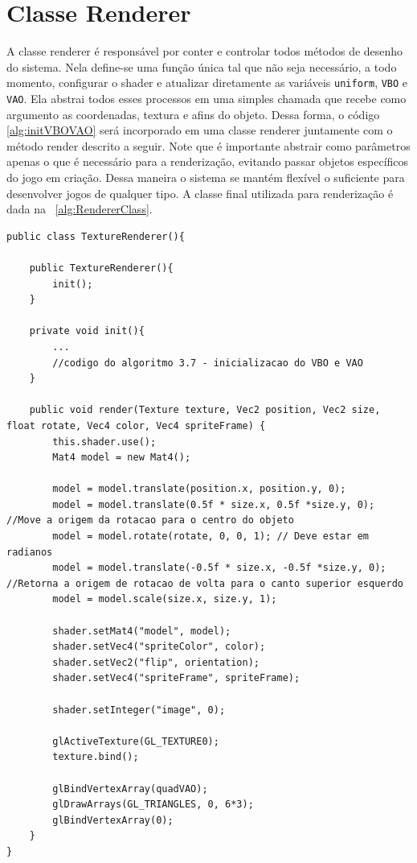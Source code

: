 \documentclass[12pt, 
openright, 
oneside, 
a4paper,    
brazil]{facom-ufu-abntex2}
\begin{document}
\section{Classe Renderer}
A classe renderer é responsável por conter e controlar todos métodos de desenho do sistema. Nela define-se uma função única tal que não seja necessário, a todo momento, configurar o shader e atualizar diretamente as variáveis \texttt{uniform}, \texttt{VBO} e \texttt{VAO}. Ela abstrai todos esses processos em uma simples chamada que recebe como argumento as coordenadas, textura e afins do objeto. Dessa forma, o código \ref{alg:initVBOVAO} será incorporado em uma classe renderer juntamente com o método render descrito a seguir. Note que é importante abstrair como parâmetros apenas o que é necessário para a renderização, evitando passar objetos específicos do jogo em criação. Dessa maneira o sistema se mantém flexível o suficiente para desenvolver jogos de qualquer tipo. A classe final utilizada para renderização é dada na \lstlistingname~\ref{alg:RendererClass}.


\begin{lstlisting}[caption=Classe renderer simples, label={alg:RendererClass}]
public class TextureRenderer(){

	public TextureRenderer(){
		init();
	}

	private void init(){
		...
		//codigo do algoritmo 3.7 - inicializacao do VBO e VAO
	}

	public void render(Texture texture, Vec2 position, Vec2 size, float rotate, Vec4 color, Vec4 spriteFrame) {
		this.shader.use();
		Mat4 model = new Mat4();
		
		model = model.translate(position.x, position.y, 0);
		model = model.translate(0.5f * size.x, 0.5f *size.y, 0); //Move a origem da rotacao para o centro do objeto
		model = model.rotate(rotate, 0, 0, 1); // Deve estar em radianos
		model = model.translate(-0.5f * size.x, -0.5f *size.y, 0); //Retorna a origem de rotacao de volta para o canto superior esquerdo
		model = model.scale(size.x, size.y, 1);
		
		shader.setMat4("model", model);
		shader.setVec4("spriteColor", color);
		shader.setVec2("flip", orientation);
		shader.setVec4("spriteFrame", spriteFrame);
		
		shader.setInteger("image", 0);
		
		glActiveTexture(GL_TEXTURE0);
		texture.bind();

		glBindVertexArray(quadVAO);
		glDrawArrays(GL_TRIANGLES, 0, 6*3);
		glBindVertexArray(0);
	}
}
\end{lstlisting}
\end{document}

